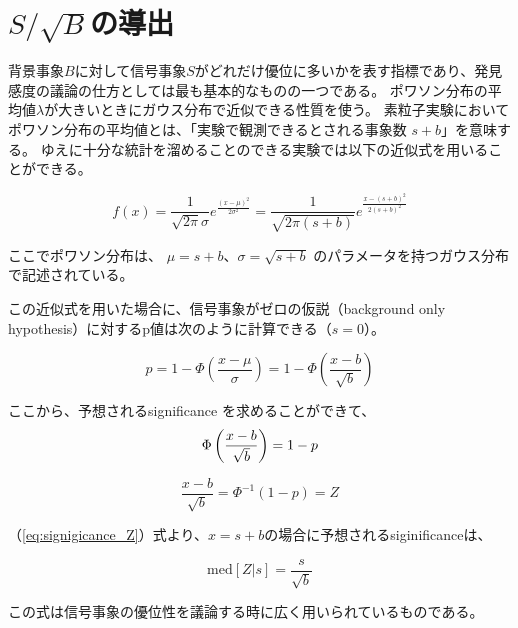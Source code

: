\documentclass[a4paper,uplatex]{jsreport}
\begin{document}
\section{$S/\sqrt{B}$の導出}
背景事象$B$に対して信号事象$S$がどれだけ優位に多いかを表す指標であり、発見感度の議論の仕方としては最も基本的なものの一つである。
ポワソン分布の平均値$\lambda$が大きいときにガウス分布で近似できる性質を使う。
素粒子実験においてポワソン分布の平均値とは、「実験で観測できるとされる事象数 $s+b$」を意味する。
ゆえに十分な統計を溜めることのできる実験では以下の近似式を用いることができる。

\begin{equation}
  f(x)
  = \frac{1}{\sqrt{2\pi}\sigma} e^{\frac{(x-\mu)^2}{2\sigma^2}}
  = \frac{1}{\sqrt{2\pi(s+b)}} e^{\frac{{x-(s+b)}^2}{2(s+b)^2}}
\end{equation}

ここでポワソン分布は、 $\mu = s+b$、$\sigma = \sqrt{s+b}$
のパラメータを持つガウス分布で記述されている。

この近似式を用いた場合に、信号事象がゼロの仮説（background only hypothesis）に対するp値は次のように計算できる（$s=0$）。

\begin{equation}
  p = 1 - \Phi \left(\frac{x-\mu}{\sigma} \right) = 1 - \Phi \left(\frac{x-b}{\sqrt{b}} \right)
\end{equation}

ここから、予想されるsignificance を求めることができて、
\begin{equation}
  \Phi \left(\frac{x-b}{\sqrt{b}} \right) = 1-p \\
\end{equation}

\begin{equation}\label{eq:signigicance_Z}
  \frac{x-b}{\sqrt{b}} = \Phi^{-1} (1-p) = Z
\end{equation}

（\ref{eq:signigicance_Z}）式より、$x=s+b$の場合に予想されるsiginificanceは、

\begin{equation}
  \mathrm{med}[Z|s] = \frac{s}{\sqrt{b}}
\end{equation}

この式は信号事象の優位性を議論する時に広く用いられているものである。
\end{document}
